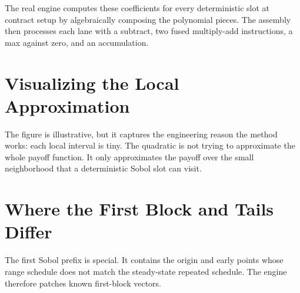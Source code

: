 \documentclass[11pt,a4paper]{article}
\begin{document}
The real engine computes these coefficients for every deterministic slot at
contract setup by algebraically composing the polynomial pieces. The assembly
then processes each lane with a subtract, two fused multiply-add instructions,
a max against zero, and an accumulation.

\section{Visualizing the Local Approximation}

\begin{center}
\end{center}

The figure is illustrative, but it captures the engineering reason the method
works: each local interval is tiny. The quadratic is not trying to approximate
the whole payoff function. It only approximates the payoff over the small
neighborhood that a deterministic Sobol slot can visit.

\section{Where the First Block and Tails Differ}

The first Sobol prefix is special. It contains the origin and early points whose
range schedule does not match the steady-state repeated schedule. The engine
therefore patches known first-block vectors.
\end{document}
